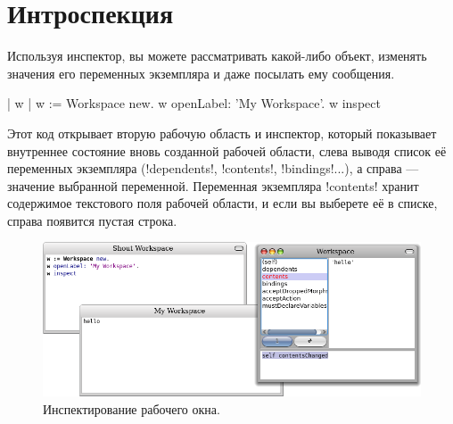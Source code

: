 \documentclass[a4paper,10pt,twoside]{book}
\begin{document}
\section{Интроспекция}

Используя инспектор, вы можете рассматривать какой-либо объект, изменять значения его переменных экземпляра и даже посылать ему сообщения. 

\begin{code}{| w |}
w := Workspace new.
w openLabel: 'My Workspace'.
w inspect
\end{code}

Этот код открывает вторую рабочую область и инспектор,
который показывает внутреннее состояние вновь созданной рабочей области, слева выводя список её переменных экземпляра (\ct!dependents!, \ct!contents!, \ct!bindings!...), а справа --- значение выбранной переменной.
Переменная экземпляра \ct!contents! хранит содержимое текстового поля рабочей области, и если вы выберете её в списке, справа появится пустая строка.

\begin{figure}[ht]\centering
	\includegraphics[width=\linewidth]{workspaceInspector}
	\caption{Инспектирование рабочего окна.\figlabel{workspaceInspector}}
\end{figure}
\end{document}
